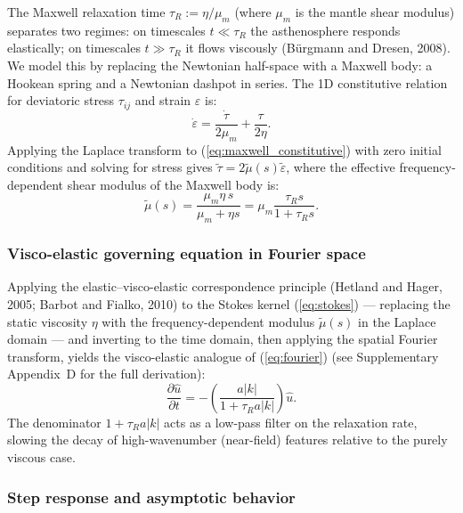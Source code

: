 \documentclass[12pt]{article}
\begin{document}
The Maxwell relaxation time $\tau_R := \eta/\mu_m$ (where $\mu_m$ is
the mantle shear modulus) separates two regimes: on timescales
$t \ll \tau_R$ the asthenosphere responds elastically; on timescales
$t \gg \tau_R$ it flows viscously (B\"{u}rgmann and Dresen, 2008).
We model this by replacing the Newtonian half-space with a Maxwell body: a
Hookean spring and a Newtonian dashpot in series. The 1D constitutive relation
for deviatoric stress $\tau_{ij}$ and strain $\varepsilon$ is:
\begin{equation}
\dot{\varepsilon} = \frac{\dot{\tau}}{2\mu_m} + \frac{\tau}{2\eta}.
\label{eq:maxwell_constitutive}
\end{equation}
Applying the Laplace transform to (\ref{eq:maxwell_constitutive}) with zero
initial conditions and solving for stress gives
$\tilde{\tau} = 2\tilde{\mu}(s)\tilde{\varepsilon}$, where the effective
frequency-dependent shear modulus of the Maxwell body is:
\begin{equation}
\tilde{\mu}(s) = \frac{\mu_m\eta\,s}{\mu_m + \eta s}
               = \mu_m\frac{\tau_R s}{1+\tau_R s}.
\label{eq:maxwell_mu}
\end{equation}

\subsubsection{Visco-elastic governing equation in Fourier space}

Applying the elastic--visco-elastic correspondence principle
(Hetland and Hager, 2005; Barbot and Fialko, 2010) to the Stokes kernel
(\ref{eq:stokes}) --- replacing the static viscosity $\eta$ with the
frequency-dependent modulus $\tilde{\mu}(s)$ in the Laplace domain --- and
inverting to the time domain, then applying the spatial Fourier transform,
yields the visco-elastic analogue of (\ref{eq:fourier}) (see Supplementary
Appendix~D for the full derivation):
\begin{equation}
\frac{\partial\hat{u}}{\partial t}
= -\left(\frac{a|k|}{1+\tau_R a|k|}\right)\hat{u}.
\label{eq:maxwell_fourier}
\end{equation}
The denominator $1+\tau_R a|k|$ acts as a low-pass filter on the relaxation
rate, slowing the decay of high-wavenumber (near-field) features relative to
the purely viscous case.

\subsubsection{Step response and asymptotic behavior}
\label{sec:maxwell_step_resp}
\end{document}
